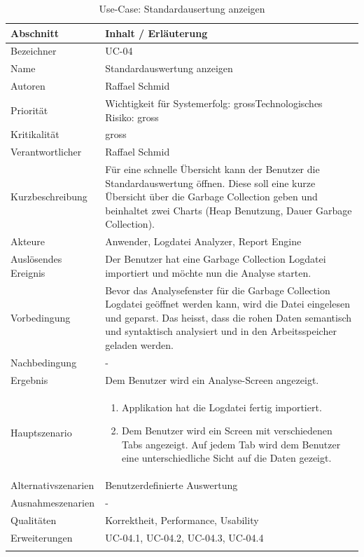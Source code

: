 \begin{longtable}{|p{4cm}|p{10.5cm}|}
\hline
   \textbf{Abschnitt} & \textbf{Inhalt / Erläuterung} \\\hline
   Bezeichner & UC-04\\\hline
   Name & Standardauswertung anzeigen\\\hline
   Autoren & Raffael Schmid\\\hline
   Priorität & Wichtigkeit für Systemerfolg: gross\newline Technologisches Risiko: gross\\\hline
   Kritikalität & gross\\\hline
   Verantwortlicher & Raffael Schmid\\\hline
   Kurzbeschreibung & Für eine schnelle Übersicht kann der Benutzer die Standardauswertung öffnen. Diese soll eine kurze Übersicht über die Garbage Collection geben und beinhaltet zwei Charts (Heap Benutzung, Dauer Garbage Collection). \\\hline
   Akteure & Anwender, Logdatei Analyzer, Report Engine\\\hline
   Auslösendes Ereignis & Der Benutzer hat eine Garbage Collection Logdatei importiert und möchte nun die Analyse starten.\\\hline
   Vorbedingung & Bevor das Analysefenster für die Garbage Collection Logdatei geöffnet werden kann, wird die Datei eingelesen und geparst. Das heisst, dass die rohen Daten semantisch und syntaktisch analysiert und in den Arbeitsspeicher geladen werden.\\\hline
   Nachbedingung & -\\\hline
   Ergebnis & Dem Benutzer wird ein Analyse-Screen angezeigt.\\\hline
   Hauptszenario & 
	\begin{enumerate}
		\item Applikation hat die Logdatei fertig importiert.
		\item Dem Benutzer wird ein Screen mit verschiedenen Tabs angezeigt. Auf jedem Tab wird dem Benutzer eine unterschiedliche Sicht auf die Daten gezeigt.
	\end{enumerate}
	\\\hline
   Alternativszenarien & Benutzerdefinierte Auswertung\\\hline
   Ausnahmeszenarien & -\\\hline
   Qualitäten &  Korrektheit, Performance, Usability\\\hline
   Erweiterungen & UC-04.1, UC-04.2, UC-04.3, UC-04.4 \\\hline
\caption{Use-Case: Standardausertung anzeigen}
\end{longtable}

